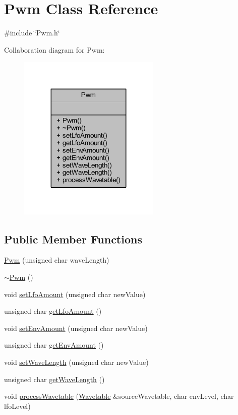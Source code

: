 \hypertarget{class_pwm}{}\section{Pwm Class Reference}
\label{class_pwm}


{\ttfamily \#include \char`\"{}Pwm.\+h\char`\"{}}



Collaboration diagram for Pwm\+:
\nopagebreak
\begin{figure}[H]
\begin{center}
\leavevmode
\includegraphics[width=191pt]{d9/d88/class_pwm__coll__graph}
\end{center}
\end{figure}
\subsection*{Public Member Functions}
\begin{DoxyCompactItemize}
\item 
\hyperlink{class_pwm_af73e0bd2862428ffc7feebc0c11de5dd}{Pwm} (unsigned char wave\+Length)
\item 
\hyperlink{class_pwm_ac97d5b9a021ea218147206706e368a22}{$\sim$\+Pwm} ()
\item 
void \hyperlink{class_pwm_a1fe2ceb8636015244b4d3ed7ef15b333}{set\+Lfo\+Amount} (unsigned char new\+Value)
\item 
unsigned char \hyperlink{class_pwm_a7b41dfa02ff30f6260b81c75627ed333}{get\+Lfo\+Amount} ()
\item 
void \hyperlink{class_pwm_acda631e927e79a31dd2fc0e0116c88fc}{set\+Env\+Amount} (unsigned char new\+Value)
\item 
unsigned char \hyperlink{class_pwm_ada7e7bc3b17ee5fe5fb7af5379486e8e}{get\+Env\+Amount} ()
\item 
void \hyperlink{class_pwm_a65828f1098ab41b17141dd614aa420ec}{set\+Wave\+Length} (unsigned char new\+Value)
\item 
unsigned char \hyperlink{class_pwm_a8d525e1a70c9a96c3a0ab4b0307da953}{get\+Wave\+Length} ()
\item 
void \hyperlink{class_pwm_a51b2ea74a5b67115148141a843cddca1}{process\+Wavetable} (\hyperlink{class_wavetable}{Wavetable} \&source\+Wavetable, char env\+Level, char lfo\+Level)
\end{DoxyCompactItemize}


